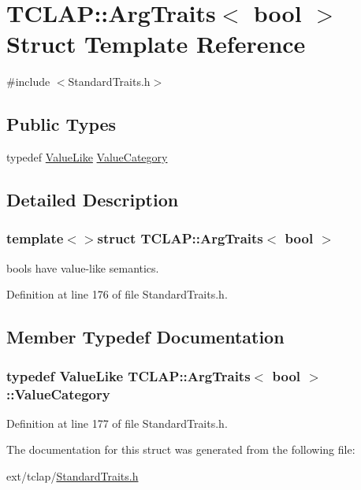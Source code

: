 \hypertarget{struct_t_c_l_a_p_1_1_arg_traits_3_01bool_01_4}{}\section{T\+C\+L\+A\+P\+:\+:Arg\+Traits$<$ bool $>$ Struct Template Reference}
\label{struct_t_c_l_a_p_1_1_arg_traits_3_01bool_01_4}


{\ttfamily \#include $<$Standard\+Traits.\+h$>$}

\subsection*{Public Types}
\begin{DoxyCompactItemize}
\item 
typedef \hyperlink{struct_t_c_l_a_p_1_1_value_like}{Value\+Like} \hyperlink{struct_t_c_l_a_p_1_1_arg_traits_3_01bool_01_4_a86efe13e981aaef96d37ec465a8409a7}{Value\+Category}
\end{DoxyCompactItemize}


\subsection{Detailed Description}
\subsubsection*{template$<$$>$struct T\+C\+L\+A\+P\+::\+Arg\+Traits$<$ bool $>$}

bools have value-\/like semantics. 

Definition at line 176 of file Standard\+Traits.\+h.



\subsection{Member Typedef Documentation}
\hypertarget{struct_t_c_l_a_p_1_1_arg_traits_3_01bool_01_4_a86efe13e981aaef96d37ec465a8409a7}{}
\subsubsection[{Value\+Category}]{\setlength{\rightskip}{0pt plus 5cm}typedef {\bf Value\+Like} {\bf T\+C\+L\+A\+P\+::\+Arg\+Traits}$<$ bool $>$\+::{\bf Value\+Category}}\label{struct_t_c_l_a_p_1_1_arg_traits_3_01bool_01_4_a86efe13e981aaef96d37ec465a8409a7}


Definition at line 177 of file Standard\+Traits.\+h.



The documentation for this struct was generated from the following file\+:\begin{DoxyCompactItemize}
\item 
ext/tclap/\hyperlink{_standard_traits_8h}{Standard\+Traits.\+h}\end{DoxyCompactItemize}

